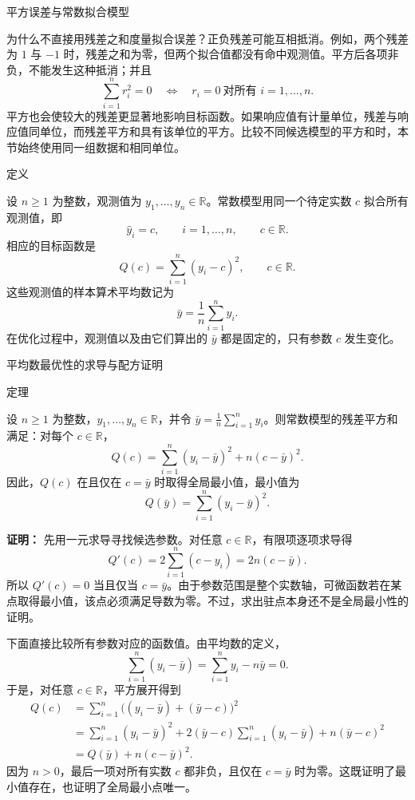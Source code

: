 \documentclass[aspectratio=169,10pt,fontset=fandol]{ctexbeamer}
\begin{document}
\begin{frame}[t,fragile]{平方误差与常数拟合模型}
\small
{\small
为什么不直接用残差之和度量拟合误差？正负残差可能互相抵消。例如，两个残差为 $1$ 与 $-1$ 时，残差之和为零，但两个拟合值都没有命中观测值。平方后各项非负，不能发生这种抵消；并且
\[
\sum_{i=1}^{n}r_i^2=0\quad\Longleftrightarrow\quad r_i=0\ \text{对所有 }i=1,\ldots,n.
\]
平方也会使较大的残差更显著地影响目标函数。如果响应值有计量单位，残差与响应值同单位，而残差平方和具有该单位的平方。比较不同候选模型的平方和时，本节始终使用同一组数据和相同单位。\par

}
\begin{block}{定义}
{\small
设 $n\geq1$ 为整数，观测值为 $y_1,\ldots,y_n\in\mathbb{R}$。常数模型用同一个待定实数 $c$ 拟合所有观测值，即
\[
\hat{y}_i=c,\qquad i=1,\ldots,n,\qquad c\in\mathbb{R}.
\]
相应的目标函数是
\[
Q(c)=\sum_{i=1}^{n}(y_i-c)^2,\qquad c\in\mathbb{R}.
\]
这些观测值的样本算术平均数记为
\[
\bar{y}=\frac{1}{n}\sum_{i=1}^{n}y_i.
\]
在优化过程中，观测值以及由它们算出的 $\bar{y}$ 都是固定的，只有参数 $c$ 发生变化。

}
\end{block}
\end{frame}
\begin{frame}[t,fragile]{平均数最优性的求导与配方证明}
\small
\begin{block}{定理}
{\small
设 $n\geq1$ 为整数，$y_1,\ldots,y_n\in\mathbb{R}$，并令 $\bar{y}=\frac{1}{n}\sum_{i=1}^{n}y_i$。则常数模型的残差平方和满足：对每个 $c\in\mathbb{R}$，
\[
Q(c)=\sum_{i=1}^{n}(y_i-\bar{y})^2+n(c-\bar{y})^2.
\]
因此，$Q(c)$ 在且仅在 $c=\bar{y}$ 时取得全局最小值，最小值为
\[
Q(\bar{y})=\sum_{i=1}^{n}(y_i-\bar{y})^2.
\]

}
\end{block}
\pause
{\small
\textbf{证明：}
先用一元求导寻找候选参数。对任意 $c\in\mathbb{R}$，有限项逐项求导得
\[
Q'(c)=2\sum_{i=1}^{n}(c-y_i)=2n(c-\bar{y}).
\]
所以 $Q'(c)=0$ 当且仅当 $c=\bar{y}$。由于参数范围是整个实数轴，可微函数若在某点取得最小值，该点必须满足导数为零。不过，求出驻点本身还不是全局最小性的证明。

下面直接比较所有参数对应的函数值。由平均数的定义，
\[
\sum_{i=1}^{n}(y_i-\bar{y})=\sum_{i=1}^{n}y_i-n\bar{y}=0.
\]
于是，对任意 $c\in\mathbb{R}$，平方展开得到
\[
\begin{aligned}
Q(c)&=\sum_{i=1}^{n}\bigl((y_i-\bar{y})+(\bar{y}-c)\bigr)^2\\
&=\sum_{i=1}^{n}(y_i-\bar{y})^2
 +2(\bar{y}-c)\sum_{i=1}^{n}(y_i-\bar{y})
 +n(\bar{y}-c)^2\\
&=Q(\bar{y})+n(c-\bar{y})^2.
\end{aligned}
\]
因为 $n>0$，最后一项对所有实数 $c$ 都非负，且仅在 $c=\bar{y}$ 时为零。这既证明了最小值存在，也证明了全局最小点唯一。

}
\end{frame}
\end{document}
